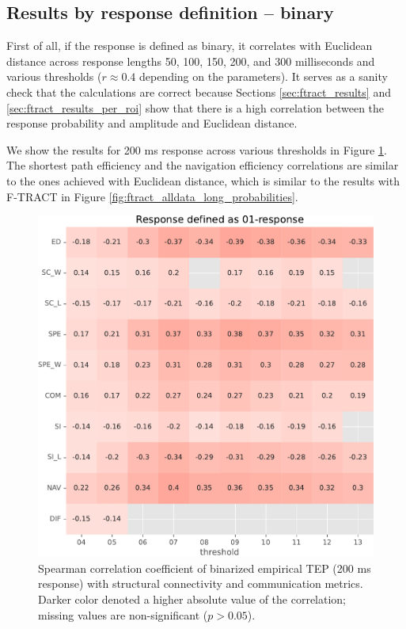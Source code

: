 \subsection{Results by response definition -- binary}

First of all, if the response is defined as binary, it correlates with Euclidean distance across response lengths 50, 100, 150, 200, and 300 milliseconds and various thresholds ($r \approx 0.4$ depending on the parameters). It serves as a sanity check that the calculations are correct because Sections \ref{sec:ftract_results} and \ref{sec:ftract_results_per_roi} show that there is a high correlation between the response probability and amplitude and Euclidean distance. 

We show the results for 200 ms response across various thresholds in Figure \ref{fig:tms_01_200}. The shortest path efficiency and the navigation efficiency correlations are similar to the ones achieved with Euclidean distance, which is similar to the results with F-TRACT in Figure \ref{fig:ftract_alldata_long_probabilities}.

\begin{figure}
    \centering
    \includegraphics[width=\textwidth]{images/nootebook_generated/pytepfit_results/empirical/200/not_over_threshold_nan/Response defined as 01-response.pdf}
    \caption[Binarized TEP (200 ms) correlations]{Spearman correlation coefficient of binarized empirical TEP (200 ms response) with structural connectivity and communication metrics. Darker color denoted a higher absolute value of the correlation; missing values are non-significant ($p>0.05$).}
    \label{fig:tms_01_200}
\end{figure}

